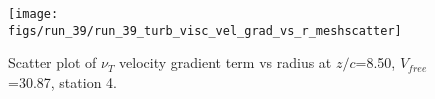 \begin{figure}[H]
\centering
\texttt{[image: figs/run\_39/run\_39\_turb\_visc\_vel\_grad\_vs\_r\_meshscatter]}
\caption{Scatter plot of $\nu_T$ velocity gradient term vs radius at $z/c$=8.50, $V_{free}$=30.87, station 4.}
\label{fig:run_39_turb_visc_vel_grad_vs_r_meshscatter}
\end{figure}


